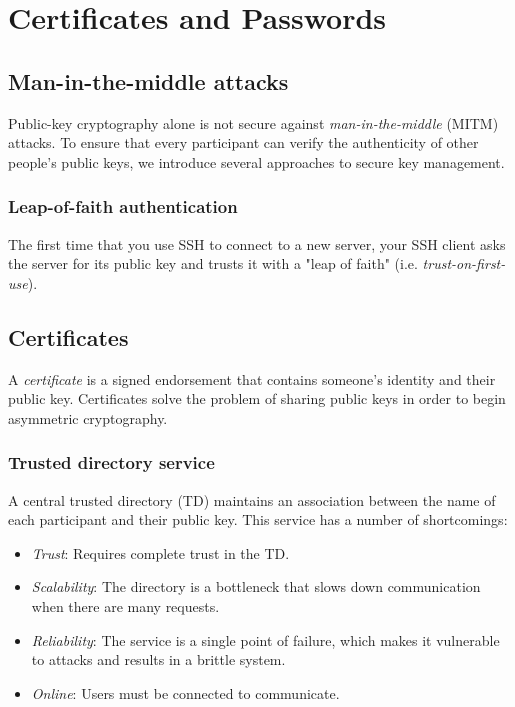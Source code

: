 \chapter{Certificates and Passwords}

\section{Man-in-the-middle attacks}
Public-key cryptography alone is not secure against \emph{man-in-the-middle} (MITM) attacks. To ensure that every participant can verify the authenticity of other people's public keys, we introduce several approaches to secure key management.

\subsection{Leap-of-faith authentication}
The first time that you use SSH to connect to a new server, your SSH client asks the server for its public key and trusts it with a "leap of faith" (i.e. \emph{trust-on-first-use}).

\section{Certificates}
A \emph{certificate} is a signed endorsement that contains someone's identity and their public key. Certificates solve the problem of sharing public keys in order to begin asymmetric cryptography.

\subsection{Trusted directory service}
A central trusted directory (TD) maintains an association between the name of each participant and their public key. This service has a number of shortcomings:
\begin{itemize}
    \item \emph{Trust}: Requires complete trust in the TD.
    \item \emph{Scalability}: The directory is a bottleneck that slows down communication when there are many requests.
    \item \emph{Reliability}: The service is a single point of failure, which makes it vulnerable to attacks and results in a brittle system.
    \item \emph{Online}: Users must be connected to communicate.
\end{itemize}

